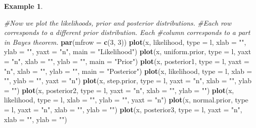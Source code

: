 \documentclass[
]{book}
\newenvironment{Shaded}{\begin{snugshade}}{\end{snugshade}}
\newcommand{\AttributeTok}[1]{\textcolor[rgb]{0.13,0.29,0.53}{#1}}
\newcommand{\CommentTok}[1]{\textcolor[rgb]{0.56,0.35,0.01}{\textit{#1}}}
\newcommand{\DecValTok}[1]{\textcolor[rgb]{0.00,0.00,0.81}{#1}}
\newcommand{\FunctionTok}[1]{\textcolor[rgb]{0.13,0.29,0.53}{\textbf{#1}}}
\newcommand{\NormalTok}[1]{#1}
\newcommand{\StringTok}[1]{\textcolor[rgb]{0.31,0.60,0.02}{#1}}
\theoremstyle{definition}
\theoremstyle{definition}
\newtheorem{example}{Example}[chapter]
\theoremstyle{definition}
\theoremstyle{definition}
\theoremstyle{remark}
\begin{document}
\begin{example}
\begin{Shaded}
\begin{Highlighting}[]
\CommentTok{\#Now we plot the likelihoods, prior and posterior distributions. }
\CommentTok{\#Each row corresponds to a different prior distribution. Each}
\CommentTok{\#column corresponds to a part in Bayes\textquotesingle{} theorem. }
\FunctionTok{par}\NormalTok{(}\AttributeTok{mfrow =} \FunctionTok{c}\NormalTok{(}\DecValTok{3}\NormalTok{, }\DecValTok{3}\NormalTok{))}
\FunctionTok{plot}\NormalTok{(x, likelihood, }\AttributeTok{type =} \StringTok{\textquotesingle{}l\textquotesingle{}}\NormalTok{, }\AttributeTok{xlab =} \StringTok{""}\NormalTok{, }\AttributeTok{ylab =} \StringTok{""}\NormalTok{, }\AttributeTok{yaxt =} \StringTok{"n"}\NormalTok{, }\AttributeTok{main =} \StringTok{"Likelihood"}\NormalTok{)}
\FunctionTok{plot}\NormalTok{(x, uniform.prior, }\AttributeTok{type =} \StringTok{\textquotesingle{}l\textquotesingle{}}\NormalTok{, }\AttributeTok{yaxt =} \StringTok{"n"}\NormalTok{, }\AttributeTok{xlab =} \StringTok{""}\NormalTok{, }\AttributeTok{ylab =} \StringTok{""}\NormalTok{, }\AttributeTok{main =} \StringTok{"Prior"}\NormalTok{)}
\FunctionTok{plot}\NormalTok{(x, posterior1, }\AttributeTok{type =} \StringTok{\textquotesingle{}l\textquotesingle{}}\NormalTok{, }\AttributeTok{yaxt =} \StringTok{"n"}\NormalTok{, }\AttributeTok{xlab =} \StringTok{""}\NormalTok{, }\AttributeTok{ylab =} \StringTok{""}\NormalTok{, }\AttributeTok{main =} \StringTok{"Posterior"}\NormalTok{)}
\FunctionTok{plot}\NormalTok{(x, likelihood, }\AttributeTok{type =} \StringTok{\textquotesingle{}l\textquotesingle{}}\NormalTok{, }\AttributeTok{xlab =} \StringTok{""}\NormalTok{, }\AttributeTok{ylab =} \StringTok{""}\NormalTok{, }\AttributeTok{yaxt =} \StringTok{"n"}\NormalTok{)}
\FunctionTok{plot}\NormalTok{(x, step.prior, }\AttributeTok{type =} \StringTok{\textquotesingle{}l\textquotesingle{}}\NormalTok{, }\AttributeTok{yaxt =} \StringTok{"n"}\NormalTok{, }\AttributeTok{xlab =} \StringTok{""}\NormalTok{, }\AttributeTok{ylab =} \StringTok{""}\NormalTok{)}
\FunctionTok{plot}\NormalTok{(x, posterior2, }\AttributeTok{type =} \StringTok{\textquotesingle{}l\textquotesingle{}}\NormalTok{, }\AttributeTok{yaxt =} \StringTok{"n"}\NormalTok{, }\AttributeTok{xlab =} \StringTok{""}\NormalTok{, }\AttributeTok{ylab =} \StringTok{""}\NormalTok{)}
\FunctionTok{plot}\NormalTok{(x, likelihood, }\AttributeTok{type =} \StringTok{\textquotesingle{}l\textquotesingle{}}\NormalTok{, }\AttributeTok{xlab =} \StringTok{""}\NormalTok{, }\AttributeTok{ylab =} \StringTok{""}\NormalTok{, }\AttributeTok{yaxt =} \StringTok{"n"}\NormalTok{)}
\FunctionTok{plot}\NormalTok{(x, normal.prior, }\AttributeTok{type =} \StringTok{\textquotesingle{}l\textquotesingle{}}\NormalTok{, }\AttributeTok{yaxt =} \StringTok{"n"}\NormalTok{, }\AttributeTok{xlab =} \StringTok{""}\NormalTok{, }\AttributeTok{ylab =} \StringTok{""}\NormalTok{)}
\FunctionTok{plot}\NormalTok{(x, posterior3, }\AttributeTok{type =} \StringTok{\textquotesingle{}l\textquotesingle{}}\NormalTok{, }\AttributeTok{yaxt =} \StringTok{"n"}\NormalTok{, }\AttributeTok{xlab =} \StringTok{""}\NormalTok{, }\AttributeTok{ylab =} \StringTok{""}\NormalTok{)}
\end{Highlighting}
\end{Shaded}


\end{example}
\end{document}
